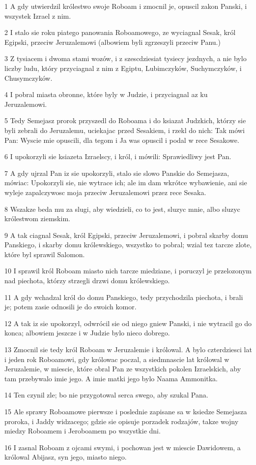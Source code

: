 \par 1 A gdy utwierdzil królestwo swoje Roboam i zmocnil je, opuscil zakon Panski, i wszystek Izrael z nim.
\par 2 I stalo sie roku piatego panowania Roboamowego, ze wyciagnal Sesak, król Egipski, przeciw Jeruzalemowi (albowiem byli zgrzeszyli przeciw Panu.)
\par 3 Z tysiacem i dwoma stami wozów, i z szescdziesiat tysiecy jezdnych, a nie bylo liczby ludu, który przyciagnal z nim z Egiptu, Lubimczyków, Suchymczyków, i Chusymczyków.
\par 4 I pobral miasta obronne, które byly w Judzie, i przyciagnal az ku Jeruzalemowi.
\par 5 Tedy Semejasz prorok przyszedl do Roboama i do ksiazat Judzkich, którzy sie byli zebrali do Jeruzalemu, uciekajac przed Sesakiem, i rzekl do nich: Tak mówi Pan: Wyscie mie opuscili, dla tegom i Ja was opuscil i podal w rece Sesakowe.
\par 6 I upokorzyli sie ksiazeta Izraelscy, i król, i mówili: Sprawiedliwy jest Pan.
\par 7 A gdy ujrzal Pan iz sie upokorzyli, stalo sie slowo Panskie do Semejasza, mówiac: Upokorzyli sie, nie wytrace ich; ale im dam wkrótce wybawienie, ani sie wyleje zapalczywosc moja przeciw Jeruzalemowi przez rece Sesaka.
\par 8 Wszakze beda mu za slugi, aby wiedzieli, co to jest, sluzyc mnie, albo sluzyc królestwom ziemskim.
\par 9 A tak ciagnal Sesak, król Egipski, przeciw Jeruzalemowi, i pobral skarby domu Panskiego, i skarby domu królewskiego, wszystko to pobral; wzial tez tarcze zlote, które byl sprawil Salomon.
\par 10 I sprawil król Roboam miasto nich tarcze miedziane, i poruczyl je przelozonym nad piechota, którzy strzegli drzwi domu królewskiego.
\par 11 A gdy wchadzal król do domu Panskiego, tedy przychodzila piechota, i brali je; potem zasie odnosili je do swoich komor.
\par 12 A tak iz sie upokorzyl, odwrócil sie od niego gniew Panski, i nie wytracil go do konca; albowiem jeszcze i w Judzie bylo nieco dobrego.
\par 13 Zmocnil sie tedy król Roboam w Jeruzalemie i królowal. A bylo czterdziesci lat i jeden rok Roboamowi, gdy królowac poczal, a siedmnascie lat królowal w Jeruzalemie, w miescie, które obral Pan ze wszystkich pokolen Izraelskich, aby tam przebywalo imie jego. A imie matki jego bylo Naama Ammonitka.
\par 14 Ten czynil zle; bo nie przygotowal serca swego, aby szukal Pana.
\par 15 Ale sprawy Roboamowe pierwsze i poslednie zapisane sa w ksiedze Semejasza proroka, i Jaddy widzacego; gdzie sie opisuje porzadek rodzajów, takze wojny miedzy Roboamem i Jeroboamem po wszystkie dni.
\par 16 I zasnal Roboam z ojcami swymi, i pochowan jest w miescie Dawidowem, a królowal Abijasz, syn jego, miasto niego.

